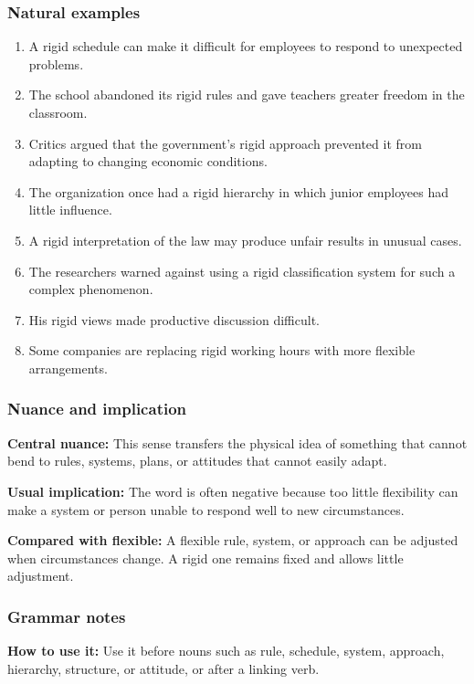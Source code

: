 \documentclass[11pt]{article}
\begin{document}
\subsubsection{Natural examples}
\begin{enumerate}
  \item A rigid schedule can make it difficult for employees to respond to unexpected problems.
  \item The school abandoned its rigid rules and gave teachers greater freedom in the classroom.
  \item Critics argued that the government's rigid approach prevented it from adapting to changing economic conditions.
  \item The organization once had a rigid hierarchy in which junior employees had little influence.
  \item A rigid interpretation of the law may produce unfair results in unusual cases.
  \item The researchers warned against using a rigid classification system for such a complex phenomenon.
  \item His rigid views made productive discussion difficult.
  \item Some companies are replacing rigid working hours with more flexible arrangements.
\end{enumerate}

\subsubsection{Nuance and implication}
\textbf{Central nuance:} This sense transfers the physical idea of something that cannot bend to rules, systems, plans, or attitudes that cannot easily adapt.

\textbf{Usual implication:} The word is often negative because too little flexibility can make a system or person unable to respond well to new circumstances.

\textbf{Compared with flexible:} A flexible rule, system, or approach can be adjusted when circumstances change. A rigid one remains fixed and allows little adjustment.

\subsubsection{Grammar notes}
\textbf{How to use it:} Use it before nouns such as rule, schedule, system, approach, hierarchy, structure, or attitude, or after a linking verb.
\end{document}

